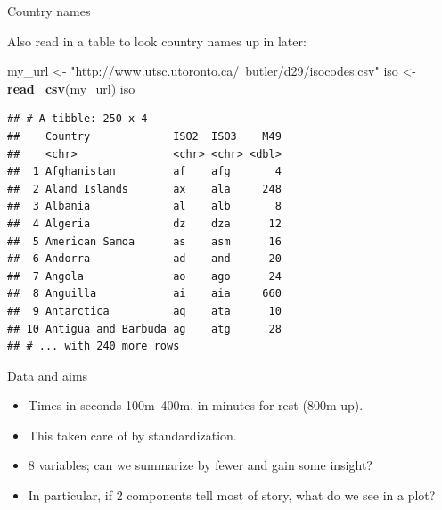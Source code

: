 \documentclass[
  ignorenonframetext,
]{beamer}
\newenvironment{Shaded}{\begin{snugshade}}{\end{snugshade}}
\newcommand{\KeywordTok}[1]{\textcolor[rgb]{0.13,0.29,0.53}{\textbf{#1}}}
\newcommand{\NormalTok}[1]{#1}
\newcommand{\StringTok}[1]{\textcolor[rgb]{0.31,0.60,0.02}{#1}}
\begin{document}
\begin{frame}[fragile]{Country names}
\protect\hypertarget{country-names}{}

Also read in a table to look country names up in later:

\footnotesize

\begin{Shaded}
\begin{Highlighting}[]
\NormalTok{my_url <-}\StringTok{ "http://www.utsc.utoronto.ca/~butler/d29/isocodes.csv"}
\NormalTok{iso <-}\StringTok{ }\KeywordTok{read_csv}\NormalTok{(my_url)}
\NormalTok{iso}
\end{Highlighting}
\end{Shaded}

\begin{verbatim}
## # A tibble: 250 x 4
##    Country             ISO2  ISO3    M49
##    <chr>               <chr> <chr> <dbl>
##  1 Afghanistan         af    afg       4
##  2 Aland Islands       ax    ala     248
##  3 Albania             al    alb       8
##  4 Algeria             dz    dza      12
##  5 American Samoa      as    asm      16
##  6 Andorra             ad    and      20
##  7 Angola              ao    ago      24
##  8 Anguilla            ai    aia     660
##  9 Antarctica          aq    ata      10
## 10 Antigua and Barbuda ag    atg      28
## # ... with 240 more rows
\end{verbatim}

\normalsize

\end{frame}

\begin{frame}{Data and aims}
\protect\hypertarget{data-and-aims}{}

\begin{itemize}
\item
  Times in seconds 100m--400m, in minutes for rest (800m up).
\item
  This taken care of by standardization.
\item
  8 variables; can we summarize by fewer and gain some insight?
\item
  In particular, if 2 components tell most of story, what do we see in a
  plot?
\end{itemize}

\end{frame}
\end{document}
